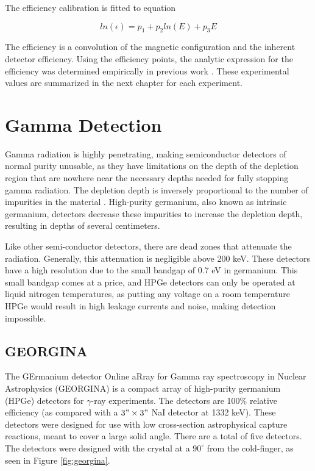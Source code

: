 

The efficiency calibration is fitted to equation

\begin{equation}
    ln(\epsilon) = p_1+p_2ln(E)+p_3E
    \label{eq:SiLi_Eff}
\end{equation}

The efficiency is a convolution of the magnetic configuration and the inherent detector efficiency. Using the efficiency points, the analytic expression for the efficiency was determined empirically in previous work \citep{battaglia15:_iceball_176lu}. These experimental values are summarized in the next chapter for each experiment.

\section{Gamma Detection}

Gamma radiation is highly penetrating, making semiconductor detectors of normal purity unusable, as they have limitations on the depth of the depletion region that are nowhere near the necessary depths needed for fully stopping gamma radiation. The depletion depth is inversely proportional to the number of impurities in the material \citep{knoll00:rad_det_meas}. High-purity germanium, also known as intrinsic germanium, detectors decrease these impurities to increase the depletion depth, resulting in depths of several centimeters.

Like other semi-conductor detectors, there are dead zones that attenuate the radiation. Generally, this attenuation is negligible above 200 keV. These detectors have a high resolution due to the small bandgap of 0.7 eV in germanium. This small bandgap comes at a price, and HPGe detectors can only be operated at liquid nitrogen temperatures, as putting any voltage on a room temperature HPGe would result in high leakage currents and noise, making detection impossible.

\subsection{GEORGINA}

The GErmanium detector Online aRray for Gamma ray spectroscopy in Nuclear Astrophysics (GEORGINA) is a compact array of high-purity germanium (HPGe) detectors for $\gamma$-ray experiments\citep{isnap18:_georgina}. The detectors are 100\% relative efficiency (as compared with a $3"\times3"$ NaI detector at 1332 keV). These detectors were designed for use with low cross-section astrophysical capture reactions, meant to cover a large solid angle. There are a total of five detectors. The detectors were designed with the crystal at a $90^{\circ}$ from the cold-finger, as seen in Figure \ref{fig:georgina}.

